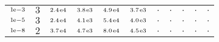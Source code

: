 \begin{tiny}
\begin{tabular}{@{$\;$}c@{$\;$}|@{$\;$}c@{$\;$}@{$\;$}c@{$\;$}@{$\;$}c@{$\;$}@{$\;$}c@{$\;$}@{$\;$}c@{$\;$}|@{$\;$}c@{$\;$}@{$\;$}c@{$\;$}@{$\;$}c@{$\;$}@{$\;$}c@{$\;$}@{$\;$}c@{$\;$}}
$\scriptstyle1\!\mathrm{\hspace{0.10em}e}-3$ & $\scriptstyle3$ & $\scriptstyle2.4\mathrm{\hspace{0.10em}e}4$ & $\scriptstyle3.8\mathrm{\hspace{0.10em}e}3$ & $\scriptstyle4.9\mathrm{\hspace{0.10em}e}4$ & $\scriptstyle3.7\mathrm{\hspace{0.10em}e}3$ & $\scriptstyle.$ & $\scriptstyle.$ & $\scriptstyle.$ & $\scriptstyle.$ & $\scriptstyle.$\\ 
$\scriptstyle1\!\mathrm{\hspace{0.10em}e}-5$ & $\scriptstyle3$ & $\scriptstyle2.4\mathrm{\hspace{0.10em}e}4$ & $\scriptstyle4.1\mathrm{\hspace{0.10em}e}3$ & $\scriptstyle5.4\mathrm{\hspace{0.10em}e}4$ & $\scriptstyle4.0\mathrm{\hspace{0.10em}e}3$ & $\scriptstyle.$ & $\scriptstyle.$ & $\scriptstyle.$ & $\scriptstyle.$ & $\scriptstyle.$\\ 
$\scriptstyle1\!\mathrm{\hspace{0.10em}e}-8$ & $\scriptstyle2$ & $\scriptstyle3.7\mathrm{\hspace{0.10em}e}4$ & $\scriptstyle4.7\mathrm{\hspace{0.10em}e}3$ & $\scriptstyle8.0\mathrm{\hspace{0.10em}e}4$ & $\scriptstyle4.5\mathrm{\hspace{0.10em}e}3$ & $\scriptstyle.$ & $\scriptstyle.$ & $\scriptstyle.$ & $\scriptstyle.$ & $\scriptstyle.$\\ 
\end{tabular} 
\end{tiny} 
